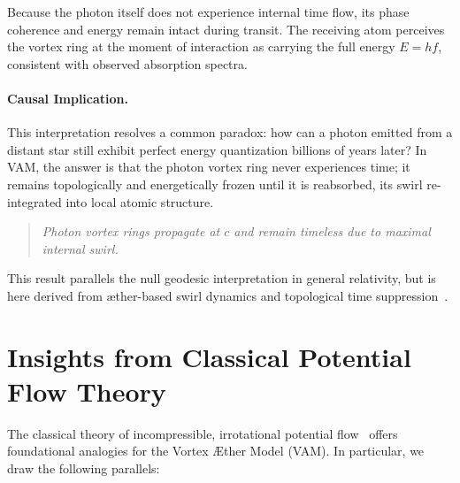         Because the photon itself does not experience internal time flow, its phase coherence and energy remain intact during transit. The receiving atom perceives the vortex ring at the moment of interaction as carrying the full energy $E = h f$, consistent with observed absorption spectra.

        \paragraph{Causal Implication.}
        This interpretation resolves a common paradox: how can a photon emitted from a distant star still exhibit perfect energy quantization billions of years later? In VAM, the answer is that the photon vortex ring never experiences time; it remains topologically and energetically frozen until it is reabsorbed, its swirl re-integrated into local atomic structure.

        \begin{quote}
            \emph{Photon vortex rings propagate at  $c$  and remain timeless due to maximal internal swirl.}
        \end{quote}

        This result parallels the null geodesic interpretation in general relativity, but is here derived from æther-based swirl dynamics and topological time suppression~\cite{iskandarani2025b, battye1998}.

\section{Insights from Classical Potential Flow Theory}
        The classical theory of incompressible, irrotational potential flow~\cite{caughey2008} offers foundational analogies for the Vortex \AE ther Model (VAM). In particular, we draw the following parallels:

